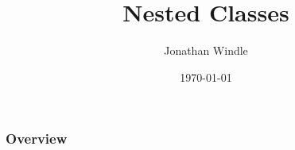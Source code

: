 \documentclass{beamer}
\title[Nested Classes]{Nested Classes} %
\author{Jonathan Windle} %
\institute[UEA] %
{
University of East Anglia \\ %
\medskip
\textit{J.Windle@uea.ac.uk} %
}
\date{\today} %
\begin{document}
\begin{frame}
\titlepage %
\end{frame}

\begin{frame}[allowframebreaks]
\frametitle{Overview} %
\tableofcontents %
\end{frame}
\end{document}
